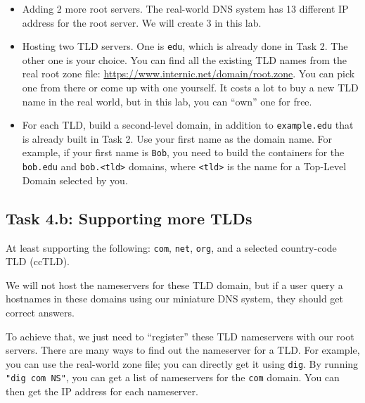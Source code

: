 \begin{itemize}
\item Adding 2 more root servers. The real-world DNS system has 13 different 
IP address for the root server. We will create 3 in this lab.

\item Hosting two TLD servers. One is \texttt{edu}, which is already 
done in Task 2. The other one is your choice. 
You can find all the existing TLD names from the 
real root zone file: \url{https://www.internic.net/domain/root.zone}.
You can pick one from there or come up with one yourself. 
It costs a lot to buy a new TLD name in the real world, but in this lab, you 
can ``own'' one for free. 

\item For each TLD, build a second-level domain, in
addition to \texttt{example.edu} that is already built in Task 2. 
Use your first name as the domain name. 
For example, if your first name is \texttt{Bob}, you need to build the containers 
for the \texttt{bob.edu} and \texttt{bob.<tld>} domains,
where \texttt{<tld>} is the name for a Top-Level Domain selected
by you. 
\end{itemize}
 




\subsection{Task 4.b: Supporting more TLDs}


At least supporting the following: 
\texttt{com}, \texttt{net}, \texttt{org}, and 
a selected country-code TLD (ccTLD).

We will not host the nameservers for these TLD domain, but 
if a user query a hostnames in these domains using our miniature
DNS system, they should get correct answers.  

To achieve that, we just need to ``register'' these TLD nameservers
with our root servers. 
There are many ways to find out the nameserver for a TLD. For example,
you can use the real-world zone file; you can directly
get it using \texttt{dig}. By running \texttt{"dig com NS"}, you
can get a list of nameservers for the \texttt{com} domain.
You can then get the IP address for each nameserver. 




